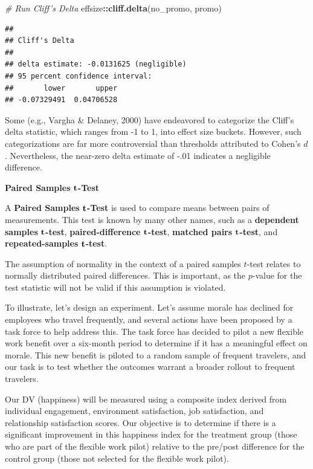 \documentclass[]{book}
\newenvironment{Shaded}{\begin{snugshade}}{\end{snugshade}}
\newcommand{\CommentTok}[1]{\textcolor[rgb]{0.56,0.35,0.01}{\textit{#1}}}
\newcommand{\KeywordTok}[1]{\textcolor[rgb]{0.13,0.29,0.53}{\textbf{#1}}}
\newcommand{\NormalTok}[1]{#1}
\newcommand{\OperatorTok}[1]{\textcolor[rgb]{0.81,0.36,0.00}{\textbf{#1}}}
\begin{document}
\begin{Shaded}
\begin{Highlighting}[]
\CommentTok{# Run Cliff's Delta}
\NormalTok{effsize}\OperatorTok{::}\KeywordTok{cliff.delta}\NormalTok{(no_promo, promo)}
\end{Highlighting}
\end{Shaded}

\begin{verbatim}
## 
## Cliff's Delta
## 
## delta estimate: -0.0131625 (negligible)
## 95 percent confidence interval:
##       lower       upper 
## -0.07329491  0.04706528
\end{verbatim}

Some (e.g., Vargha \& Delaney, 2000) have endeavored to categorize the Cliff's delta statistic, which ranges from -1 to 1, into effect size buckets. However, such categorizations are far more controversial than thresholds attributed to Cohen's \(d\). Nevertheless, the near-zero delta estimate of -.01 indicates a negligible difference.

\textbf{Paired Samples} \(\textbf t\)\textbf{-Test}

A \textbf{Paired Samples }\(\textbf t\)\textbf{-Test} is used to compare means between pairs of measurements. This test is known by many other names, such as a \textbf{dependent samples} \(\textbf t\)\textbf{-test}, \textbf{paired-difference} \(\textbf t\)\textbf{-test}, \textbf{matched pairs} \(\textbf t\)\textbf{-test}, and \textbf{repeated-samples} \(\textbf t\)\textbf{-test}.

The assumption of normality in the context of a paired samples \(t\)-test relates to normally distributed paired differences. This is important, as the \(p\)-value for the test statistic will not be valid if this assumption is violated.

To illustrate, let's design an experiment. Let's assume morale has declined for employees who travel frequently, and several actions have been proposed by a task force to help address this. The task force has decided to pilot a new flexible work benefit over a six-month period to determine if it has a meaningful effect on morale. This new benefit is piloted to a random sample of frequent travelers, and our task is to test whether the outcomes warrant a broader rollout to frequent travelers.

Our DV (happiness) will be measured using a composite index derived from individual engagement, environment satisfaction, job satisfaction, and relationship satisfaction scores. Our objective is to determine if there is a significant improvement in this happiness index for the treatment group (those who are part of the flexible work pilot) relative to the pre/post difference for the control group (those not selected for the flexible work pilot).
\end{document}
